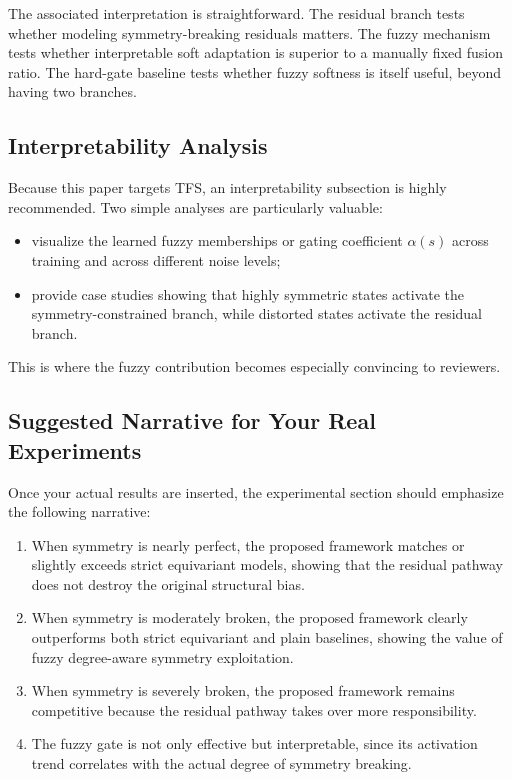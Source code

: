 \documentclass[lettersize,journal]{IEEEtran}
\begin{document}
The associated interpretation is straightforward. The residual branch tests whether modeling symmetry-breaking residuals matters. The fuzzy mechanism tests whether interpretable soft adaptation is superior to a manually fixed fusion ratio. The hard-gate baseline tests whether fuzzy softness is itself useful, beyond having two branches.

\subsection{Interpretability Analysis}
Because this paper targets TFS, an interpretability subsection is highly recommended. Two simple analyses are particularly valuable:
\begin{itemize}
\item visualize the learned fuzzy memberships or gating coefficient $\alpha(s)$ across training and across different noise levels;
\item provide case studies showing that highly symmetric states activate the symmetry-constrained branch, while distorted states activate the residual branch.
\end{itemize}

This is where the fuzzy contribution becomes especially convincing to reviewers.

\subsection{Suggested Narrative for Your Real Experiments}
Once your actual results are inserted, the experimental section should emphasize the following narrative:
\begin{enumerate}
\item When symmetry is nearly perfect, the proposed framework matches or slightly exceeds strict equivariant models, showing that the residual pathway does not destroy the original structural bias.
\item When symmetry is moderately broken, the proposed framework clearly outperforms both strict equivariant and plain baselines, showing the value of fuzzy degree-aware symmetry exploitation.
\item When symmetry is severely broken, the proposed framework remains competitive because the residual pathway takes over more responsibility.
\item The fuzzy gate is not only effective but interpretable, since its activation trend correlates with the actual degree of symmetry breaking.
\end{enumerate}
\end{document}
